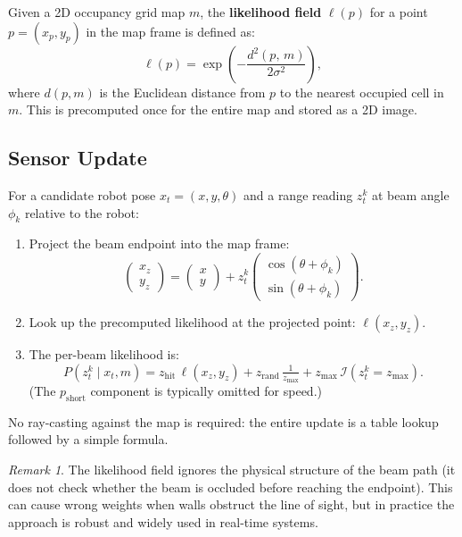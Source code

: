 \documentclass[11pt,a4paper]{article}
\theoremstyle{definition}
\theoremstyle{plain}
\theoremstyle{remark}
\newtheorem*{remark}{Remark}
\begin{document}
Given a 2D occupancy grid map $m$, the \textbf{likelihood field} $\ell(p)$ for a point $p = (x_p, y_p)$ in the map frame is defined as:
\[
    \ell(p) = \exp\!\left(-\frac{d^2(p,\, m)}{2\sigma^2}\right),
\]
where $d(p, m)$ is the Euclidean distance from $p$ to the nearest occupied cell in $m$. This is precomputed once for the entire map and stored as a 2D image.

\subsection{Sensor Update}

For a candidate robot pose $x_t = (x, y, \theta)$ and a range reading $z_t^k$ at beam angle $\phi_k$ relative to the robot:

\begin{enumerate}
    \item Project the beam endpoint into the map frame:
    \[
        \begin{pmatrix} x_z \\ y_z \end{pmatrix}
        =
        \begin{pmatrix} x \\ y \end{pmatrix}
        + z_t^k
        \begin{pmatrix} \cos(\theta + \phi_k) \\ \sin(\theta + \phi_k) \end{pmatrix}.
    \]
    \item Look up the precomputed likelihood at the projected point: $\ell(x_z, y_z)$.
    \item The per-beam likelihood is:
    \[
        P(z_t^k \mid x_t, m) = z_{\mathrm{hit}}\,\ell(x_z, y_z) + z_{\mathrm{rand}}\,\tfrac{1}{z_{\mathrm{max}}} + z_{\mathrm{max}}\,\mathcal{I}(z_t^k = z_{\mathrm{max}}). %
    \]
    (The $p_{\mathrm{short}}$ component is typically omitted for speed.)
\end{enumerate}

No ray-casting against the map is required: the entire update is a table lookup followed by a simple formula.

\begin{remark}
The likelihood field ignores the physical structure of the beam path (it does not check whether the beam is occluded before reaching the endpoint). This can cause wrong weights when walls obstruct the line of sight, but in practice the approach is robust and widely used in real-time systems.
\end{remark}
\end{document}
